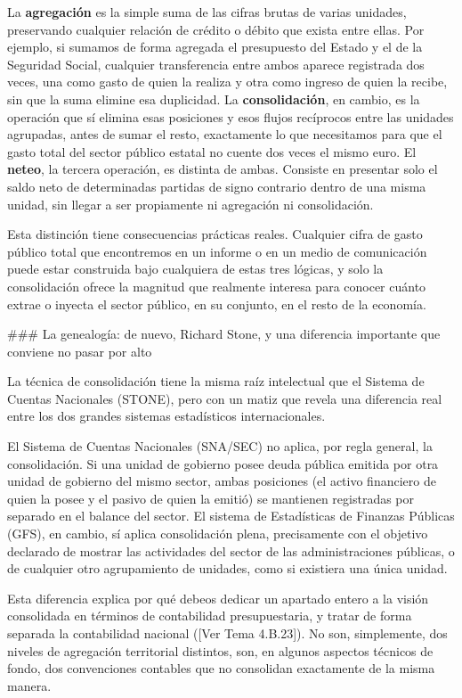 \documentclass[10pt,a4paper]{article}
\newcommand{\authorfont}[1]{{\fontfamily{EBGaramond-TLF}\selectfont #1}}
\begin{document}
La \textbf{agregación} es la simple suma de las cifras brutas de varias unidades, preservando cualquier relación de crédito o débito que exista entre ellas. Por ejemplo, si sumamos de forma agregada el presupuesto del Estado y el de la Seguridad Social, cualquier transferencia entre ambos aparece registrada dos veces, una como gasto de quien la realiza y otra como ingreso de quien la recibe, sin que la suma elimine esa duplicidad. La \textbf{consolidación}, en cambio, es la operación que sí elimina esas posiciones y esos flujos recíprocos entre las unidades agrupadas, antes de sumar el resto, exactamente lo que necesitamos para que el gasto total del sector público estatal no cuente dos veces el mismo euro. El \textbf{neteo}, la tercera operación, es distinta de ambas. Consiste en presentar solo el saldo neto de determinadas partidas de signo contrario dentro de una misma unidad, sin llegar a ser propiamente ni agregación ni consolidación. 

Esta distinción tiene consecuencias prácticas reales. Cualquier cifra de gasto público total que encontremos en un informe o en un medio de comunicación puede estar construida bajo cualquiera de estas tres lógicas, y solo la consolidación ofrece la magnitud que realmente interesa para conocer cuánto extrae o inyecta el sector público, en su conjunto, en el resto de la economía.

### La genealogía: de nuevo, Richard Stone, y una diferencia importante que conviene no pasar por alto

La técnica de consolidación tiene la misma raíz intelectual que el Sistema de Cuentas Nacionales (STONE), pero con un matiz que revela una diferencia real entre los dos grandes sistemas estadísticos internacionales.

El Sistema de Cuentas Nacionales (SNA/SEC) no aplica, por regla general, la consolidación. Si una unidad de gobierno posee deuda pública emitida por otra unidad de gobierno del mismo sector, ambas posiciones (el activo financiero de quien la posee y el pasivo de quien la emitió) se mantienen registradas por separado en el balance del sector. El sistema de Estadísticas de Finanzas Públicas (GFS), en cambio, sí aplica consolidación plena, precisamente con el objetivo declarado de mostrar las actividades del sector de las administraciones públicas, o de cualquier otro agrupamiento de unidades, como si existiera una única unidad. 

Esta diferencia explica por qué debeos dedicar un apartado entero a la visión consolidada en términos de contabilidad presupuestaria, y tratar de forma separada la contabilidad nacional ([\authorfont{Ver Tema 4.B.23}]). No son, simplemente, dos niveles de agregación territorial distintos, son, en algunos aspectos técnicos de fondo, dos convenciones contables que no consolidan exactamente de la misma manera.
\end{document}
